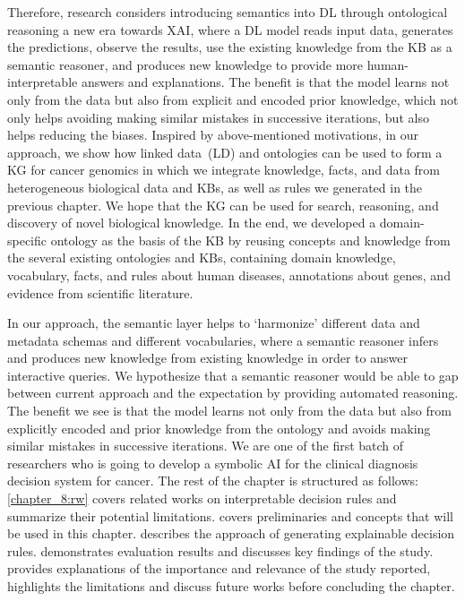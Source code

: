 \hspace*{3.5mm} Therefore, research considers introducing semantics into DL through ontological reasoning a new era towards XAI, where a DL model reads input data, generates the predictions, observe the results, use the existing knowledge from the KB as a semantic reasoner, and produces new knowledge to provide more human-interpretable answers and explanations. The benefit is that the model learns not only from the data but also from explicit and encoded prior knowledge, which not only helps avoiding making similar mistakes in successive iterations, but also helps reducing the biases. Inspired by above-mentioned motivations, in our approach, we show how linked data~(LD) and ontologies can be used to form a KG for cancer genomics in which we integrate knowledge, facts, and data from heterogeneous biological data and KBs, as well as rules we generated in the previous chapter. We hope that the KG can be used for search, reasoning, and discovery of novel biological knowledge. In the end, we developed a domain-specific ontology as the basis of the KB by reusing concepts and knowledge from the several existing ontologies and KBs, containing domain knowledge, vocabulary, facts, and rules about human diseases, annotations about genes, and evidence from scientific literature. 

\hspace*{3.5mm} In our approach, the semantic layer helps to `harmonize' different data and metadata schemas and different vocabularies, where a semantic reasoner infers and produces new knowledge from existing knowledge in order to answer interactive queries. We hypothesize that a semantic reasoner would be able to gap between current approach and the expectation by providing automated reasoning. The benefit we see is that the model learns not only from the data but also from explicitly encoded and prior knowledge from the ontology and avoids making similar mistakes in successive iterations. We are one of the first batch of researchers who is going to develop a symbolic AI for the clinical diagnosis decision system for cancer. The rest of the chapter is structured as follows: \cref{chapter_8:rw} covers  related works on interpretable decision rules and summarize their potential limitations.  covers preliminaries and concepts that will be used in this chapter.  describes the approach of generating explainable decision rules.  demonstrates evaluation results and discusses key findings of the study.  provides explanations of the importance and relevance of the study reported, highlights the limitations and discuss future works before concluding the chapter.  

